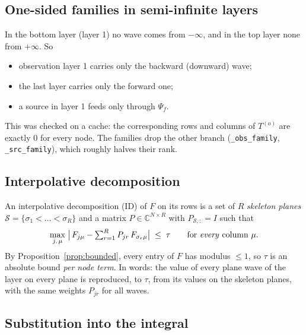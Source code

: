 \documentclass[11pt,a4paper]{article}
\newcommand{\code}[1]{\texttt{#1}}
\theoremstyle{remark}
\begin{document}
\subsection{One-sided families in semi-infinite layers}
\label{sec:onesided}

In the bottom layer (layer 1) no wave comes from $-\infty$, and in the top layer none from $+\infty$. So
\begin{itemize}[leftmargin=*]
\item observation layer 1 carries only the backward (downward) wave;
\item the last layer carries only the forward one;
\item a source in layer 1 feeds only through $\Psi_f$.
\end{itemize}
This was checked on a cache: the corresponding rows and columns of $T^{(o)}$ are exactly 0 for every node.
The families drop the other branch (\code{\_obs\_family}, \code{\_src\_family}), which roughly halves their rank.

\subsection{Interpolative decomposition}

An interpolative decomposition (ID) of $F$ on its rows is a set of $R$ \emph{skeleton planes}
$\mathcal{S}=\{\sigma_1<\dots<\sigma_R\}$ and a matrix $P\in\mathbb{C}^{N\times R}$ with $P_{\mathcal{S},:}=I$ such that
\begin{equation}
  \max_{j,\,\mu}\;\bigl|\,F_{j\mu} - \textstyle\sum_{r=1}^{R} P_{jr}\,F_{\sigma_r\mu}\bigr| \;\le\; \tau
  \qquad\text{for \emph{every} column } \mu.
  \label{eq:id}
\end{equation}
By Proposition~\ref{prop:bounded}, every entry of $F$ has modulus $\le1$, so $\tau$ is an absolute bound
\emph{per node term}. In words: the value of every plane wave of the layer on every plane is reproduced, to
$\tau$, from its values on the skeleton planes, with the same weights $P_{jr}$ for all waves.

\subsection{Substitution into the integral}
\end{document}

